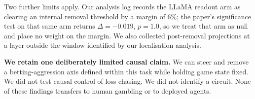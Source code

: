 Two further limits apply. Our analysis log records the LLaMA readout arm as clearing an internal
removal threshold by a margin of 6\%; the paper's significance test on that same arm returns
$\Delta = -0.019$, $p = 1.0$, so we treat that arm as null and place no weight on the margin. We
also collected post-removal projections at a layer outside the window identified by our
localisation analysis.

\textbf{We retain one deliberately limited causal claim.} We can steer and remove a
betting-aggression axis defined within this task while holding game state fixed. We did not test
causal control of loss chasing. We did not identify a circuit. None of these findings transfers to
human gambling or to deployed agents.

